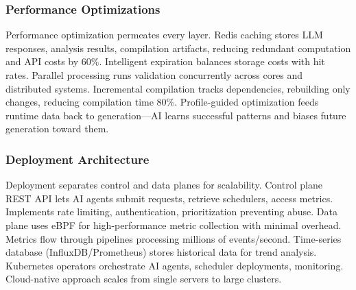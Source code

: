 \subsubsection{Performance Optimizations}
Performance optimization permeates every layer. Redis caching stores LLM responses, analysis results, compilation artifacts, reducing redundant computation and API costs by 60\%. Intelligent expiration balances storage costs with hit rates. Parallel processing runs validation concurrently across cores and distributed systems. Incremental compilation tracks dependencies, rebuilding only changes, reducing compilation time 80\%. Profile-guided optimization feeds runtime data back to generation—AI learns successful patterns and biases future generation toward them.

\subsubsection{Deployment Architecture}
Deployment separates control and data planes for scalability. Control plane REST API lets AI agents submit requests, retrieve schedulers, access metrics. Implements rate limiting, authentication, prioritization preventing abuse. Data plane uses eBPF for high-performance metric collection with minimal overhead. Metrics flow through pipelines processing millions of events/second. Time-series database (InfluxDB/Prometheus) stores historical data for trend analysis. Kubernetes operators orchestrate AI agents, scheduler deployments, monitoring. Cloud-native approach scales from single servers to large clusters.